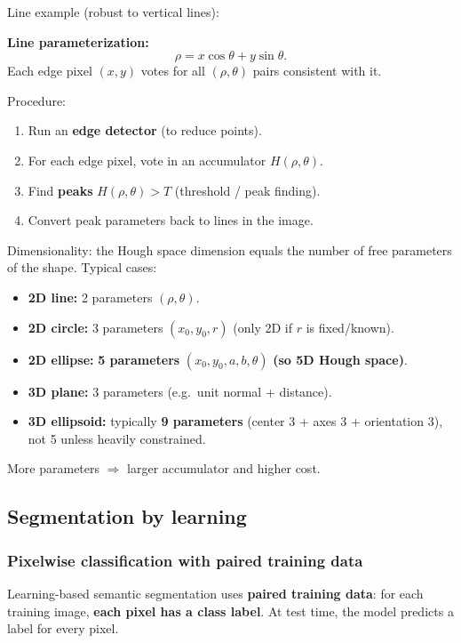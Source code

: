 \documentclass[11pt,a4paper]{article}
\begin{document}
Line example (robust to vertical lines):
\begin{mathrule}
\textbf{Line parameterization:}\quad
\[
\rho = x\cos\theta + y\sin\theta.
\]
Each edge pixel $(x,y)$ votes for all $(\rho,\theta)$ pairs consistent with it.
\end{mathrule}

Procedure:
\begin{enumerate}
  \item Run an \textbf{edge detector} (to reduce points).
  \item For each edge pixel, vote in an accumulator $H(\rho,\theta)$.
  \item Find \textbf{peaks} $H(\rho,\theta) > T$ (threshold / peak finding).
  \item Convert peak parameters back to lines in the image.
\end{enumerate}

\begin{notebox}
Dimensionality: the Hough space dimension equals the number of free parameters of the shape.
Typical cases:
\begin{itemize}
  \item \textbf{2D line:} 2 parameters $(\rho,\theta)$.
  \item \textbf{2D circle:} 3 parameters $(x_0,y_0,r)$ (only 2D if $r$ is fixed/known).
  \item \textbf{2D ellipse:} \textbf{5 parameters} $(x_0,y_0,a,b,\theta)$ \textbf{(so 5D Hough space)}.
  \item \textbf{3D plane:} 3 parameters (e.g.\ unit normal + distance).
  \item \textbf{3D ellipsoid:} typically \textbf{9 parameters} (center 3 + axes 3 + orientation 3), not 5 unless heavily constrained.
\end{itemize}
More parameters $\Rightarrow$ larger accumulator and higher cost.
\end{notebox}


\subsection{Segmentation by learning}

\subsubsection{Pixelwise classification with paired training data}
\begin{defbox}
Learning-based semantic segmentation uses \textbf{paired training data}:
for each training image, \textbf{each pixel has a class label}. At test time, the model predicts a label for every pixel.
\end{defbox}
\end{document}
